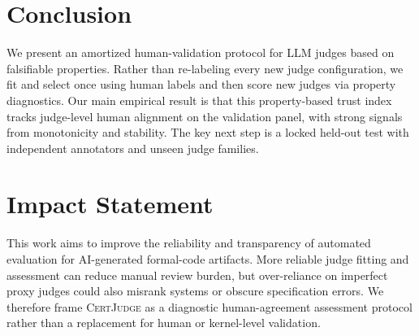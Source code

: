 \documentclass{article}
\begin{document}
\section{Conclusion}
We present an amortized human-validation protocol for LLM judges based on falsifiable properties.
Rather than re-labeling every new judge configuration, we fit and select once using human labels and then score new judges via property diagnostics.
Our main empirical result is that this property-based trust index tracks judge-level human alignment on the validation panel, with strong signals from monotonicity and stability.
The key next step is a locked held-out test with independent annotators and unseen judge families.

\section*{Impact Statement}
This work aims to improve the reliability and transparency of automated evaluation for AI-generated formal-code artifacts.
More reliable judge fitting and assessment can reduce manual review burden, but over-reliance on imperfect proxy judges could also misrank systems or obscure specification errors.
We therefore frame \textsc{CertJudge} as a diagnostic human-agreement assessment protocol rather than a replacement for human or kernel-level validation.

\newpage






\end{document}
